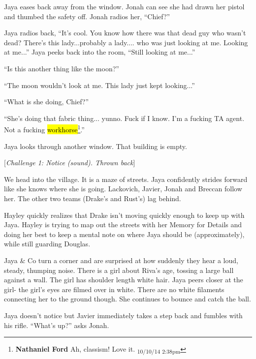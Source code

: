 {\parskip=3mm
Jaya eases back away from the window.  Jonah can see she had drawn her pistol and thumbed the safety off.  Jonah radios her, ``Chief?''

Jaya radios back, ``It's cool.  You know how there was that dead guy who wasn't dead?  There's this lady...probably a lady.... who was just looking at me.  Looking at me...'' Jaya peeks back into the room, ``Still looking at me...''

``Is this another thing like the moon?''

``The moon wouldn't look at me.  This lady just kept looking...''

``What is she doing, Chief?''

``She's doing that fabric thing... yunno.  Fuck if I know.  I'm a fucking TA agent.  Not a fucking \hl{workhorse}\footnote{\textbf{Nathaniel Ford }Ah, classism! Love it. \textsubscript{10/10/14 2:38pm}}.''

Jaya looks through another window.  That building is empty.

{[}\textit{Challenge 1: Notice (sound).  Thrown back}{]}



We head into the village.  It is a maze of streets.  Jaya confidently strides forward like she knows where she is going.  Lackovich, Javier, Jonah and Breccan follow her.  The other two teams (Drake's and Rust's) lag behind.



Hayley quickly realizes that Drake isn't moving quickly enough to keep up with Jaya.  Hayley is trying to map out the streets with her Memory for Details and doing her best to keep a mental note on where Jaya should be (approximately), while still guarding Douglas.



Jaya \& Co turn a corner and are surprised at how suddenly they hear a loud, steady, thumping noise.  There is a girl about Riva's age, tossing a large ball against a wall.  The girl has shoulder length white hair.  Jaya peers closer at the girl- the girl's eyes are filmed over in white.  There are no white filaments connecting her to the ground though.  She continues to bounce and catch the ball.



Jaya doesn't notice but Javier immediately takes a step back and fumbles with his rifle.  ``What's up?'' asks Jonah.  

}
